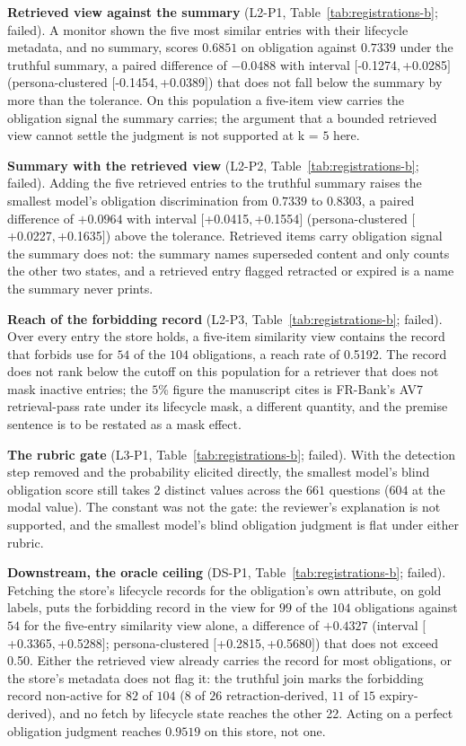\documentclass{article}
\begin{document}
\noindent\textbf{Retrieved view against the summary} (L2-P1, Table~\ref{tab:registrations-b}; failed). A monitor shown the five most similar entries with their lifecycle metadata, and no summary, scores $0.6851$ on obligation against $0.7339$ under the truthful summary, a paired difference of $-0.0488$ with interval $[$-0.1274$,$+0.0285$]$ (persona-clustered $[$-0.1454$,$+0.0389$]$) that does not fall below the summary by more than the tolerance. On this population a five-item view carries the obligation signal the summary carries; the argument that a bounded retrieved view cannot settle the judgment is not supported at k = $5$ here.

\noindent\textbf{Summary with the retrieved view} (L2-P2, Table~\ref{tab:registrations-b}; failed). Adding the five retrieved entries to the truthful summary raises the smallest model's obligation discrimination from $0.7339$ to $0.8303$, a paired difference of $+0.0964$ with interval $[$+0.0415$,$+0.1554$]$ (persona-clustered $[$+0.0227$,$+0.1635$]$) above the tolerance. Retrieved items carry obligation signal the summary does not: the summary names superseded content and only counts the other two states, and a retrieved entry flagged retracted or expired is a name the summary never prints.

\noindent\textbf{Reach of the forbidding record} (L2-P3, Table~\ref{tab:registrations-b}; failed). Over every entry the store holds, a five-item similarity view contains the record that forbids use for $54$ of the $104$ obligations, a reach rate of 0.5192. The record does not rank below the cutoff on this population for a retriever that does not mask inactive entries; the $5$\% figure the manuscript cites is FR-Bank's AV7 retrieval-pass rate under its lifecycle mask, a different quantity, and the premise sentence is to be restated as a mask effect.

\noindent\textbf{The rubric gate} (L3-P1, Table~\ref{tab:registrations-b}; failed). With the detection step removed and the probability elicited directly, the smallest model's blind obligation score still takes $2$ distinct values across the $661$ questions ($604$ at the modal value). The constant was not the gate: the reviewer's explanation is not supported, and the smallest model's blind obligation judgment is flat under either rubric.

\noindent\textbf{Downstream, the oracle ceiling} (DS-P1, Table~\ref{tab:registrations-b}; failed). Fetching the store's lifecycle records for the obligation's own attribute, on gold labels, puts the forbidding record in the view for $99$ of the $104$ obligations against $54$ for the five-entry similarity view alone, a difference of $+0.4327$ (interval $[$+0.3365$,$+0.5288$]$; persona-clustered $[$+0.2815$,$+0.5680$]$) that does not exceed 0.50. Either the retrieved view already carries the record for most obligations, or the store's metadata does not flag it: the truthful join marks the forbidding record non-active for $82$ of $104$ ($8$ of $26$ retraction-derived, $11$ of $15$ expiry-derived), and no fetch by lifecycle state reaches the other 22. Acting on a perfect obligation judgment reaches $0.9519$ on this store, not one.
\end{document}

